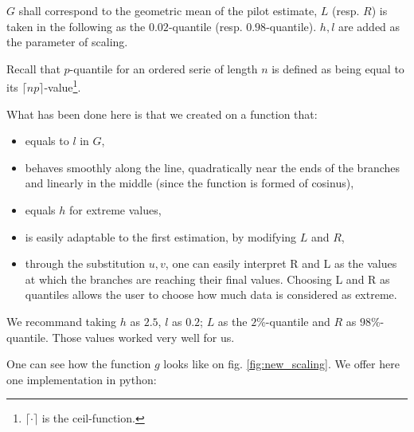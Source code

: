 \documentclass[11pt]{book}
\begin{document}
$G$ shall correspond to the geometric mean of the pilot estimate, $L$ (resp. $R$) is taken in the following as the $0.02$-quantile (resp. $0.98$-quantile). $h,l$ are added as the parameter of scaling.

Recall that $p$-quantile for an ordered serie of length $n$ is defined as being equal to its $\lceil{np}\rceil$-value\footnote{$\lceil{\cdot}\rceil$ is the ceil-function.}.


What has been done here is that we created on a function that:



\begin{itemize}
\item equals to $l$ in $G$, 
\item behaves smoothly along the line, quadratically near the ends of the branches and linearly in the middle (since the function is formed of cosinus),
\item equals $h$ for extreme values,
\item is easily adaptable to the first estimation, by modifying $L$ and $R$,
\item through the substitution $u,v$, one can easily interpret R and L as the values at which the branches are reaching their final values. Choosing L and R as quantiles allows the user to choose how much data is considered as extreme. 
\end{itemize}

\begin{remarque}
We recommand taking $h$ as $2.5$, $l$ as $0.2$; $L$ as the $2\%$-quantile and $R$ as $98\%$-quantile. Those values worked very well for us.
\end{remarque}

One can see how the function $g$ looks like on fig. \ref{fig:new_scaling}. We offer here one implementation in python:
\end{document}
